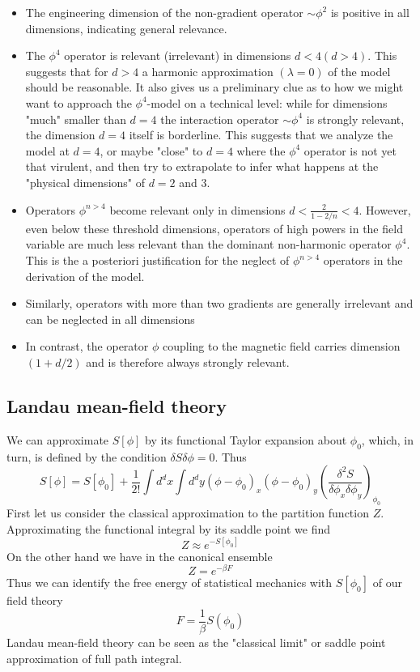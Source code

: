 \begin{itemize}
\item The engineering dimension of the non-gradient operator $\sim \phi^2$ is positive in all dimensions, indicating general relevance.
\item The $\phi^4$ operator is relevant (irrelevant) in dimensions $d < 4 (d > 4)$. This suggests that for $d > 4$ a harmonic approximation $(\lambda = 0)$ of the model should be reasonable. 
It also gives us a preliminary clue as to how we might want to approach the $\phi^4$-model on a technical level: 
while for dimensions "much" smaller than $d = 4$ the interaction operator $\sim \phi^4$ is strongly relevant, the dimension $d = 4$ itself is borderline. 
This suggests that we analyze the model at $d = 4$, or maybe "close"  to $d = 4$ where the $\phi^4$ operator is not yet that virulent, and then try to extrapolate to infer what happens at the "physical dimensions" of $d = 2$ and $3$.
\item Operators $\phi^{n > 4}$ become relevant only in dimensions $d < \frac{2}{1-2/n} < 4$. 
However, even below these threshold dimensions, operators of high powers in the field variable are much less relevant than the dominant non-harmonic operator $\phi^4$. This is the a posteriori justification for the neglect of $\phi^{n>4}$ operators in the derivation of the model.
\item Similarly, operators with more than two gradients are generally irrelevant and can be neglected in all dimensions
\item In contrast, the operator $\phi$ coupling to the magnetic field carries dimension $(1+d/2)$ and is therefore always strongly relevant.
\end{itemize}

\subsection{Landau mean-field theory}
We can approximate $S[\phi]$ by its functional Taylor expansion about $\phi_0$, which, in turn, is defined by the condition $\delta S \delta \phi = 0$. Thus
\[S[\phi] = S[\phi_0] + \frac{1}{2!} \int d^dx \int d^dy (\phi-\phi_0)_x (\phi-\phi_0)_y \left( \frac{\delta^2 S}{\delta \phi_x \delta \phi_y} \right)_{\phi_0}\]
First let us consider the classical approximation to the partition function $Z$. Approximating the functional integral by its saddle point we find
\[Z \approx e^{-S[\phi_0]}\]
On the other hand we have in the canonical ensemble
\[Z = e^{-\beta F}\]
Thus we can identify the free energy of statistical mechanics with $S[\phi_0]$ of our field theory
\[F = \frac{1}{\beta} S(\phi_0)\]
Landau mean-field theory can be seen as the "classical limit" or saddle point approximation of full path integral.

